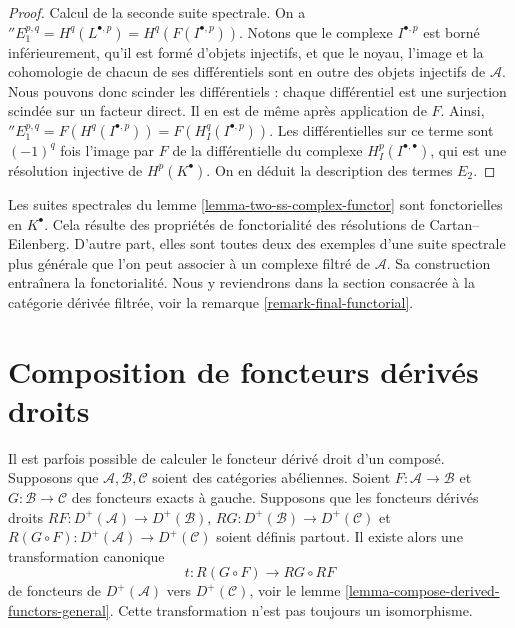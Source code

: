 \begin{proof}
\medskip\noindent
Calcul de la seconde suite spectrale. On a
${}''E_1^{p, q} = H^q(L^{\bullet, p}) = H^q(F(I^{\bullet, p}))$.
Notons que le complexe $I^{\bullet, p}$ est borné inférieurement, qu'il est
formé d'objets injectifs, et que le noyau, l'image et la cohomologie de chacun
de ses différentiels sont en outre des objets injectifs de $\mathcal{A}$. Nous
pouvons donc scinder les différentiels : chaque différentiel est une surjection
scindée sur un facteur direct. Il en est de même après application de $F$.
Ainsi,
${}''E_1^{p, q} = F(H^q(I^{\bullet, p})) = F(H^q_I(I^{\bullet, p}))$.
Les différentielles sur ce terme sont $(-1)^q$ fois l'image par $F$ de la
différentielle du complexe $H^p_I(I^{\bullet, \bullet})$, qui est une
résolution injective de $H^p(K^\bullet)$. On en déduit la description des
termes $E_2$.
\end{proof}

\begin{remark}
\label{remark-functorial-ss}
Les suites spectrales du lemme \ref{lemma-two-ss-complex-functor} sont
fonctorielles en $K^\bullet$. Cela résulte des propriétés de
fonctorialité des résolutions de Cartan--Eilenberg. D'autre part, elles sont
toutes deux des exemples d'une suite spectrale plus générale que l'on peut
associer à un complexe filtré de $\mathcal{A}$. Sa construction entraînera la
fonctorialité. Nous y reviendrons dans la section consacrée à la catégorie
dérivée filtrée, voir la remarque \ref{remark-final-functorial}.
\end{remark}


\section{Composition de foncteurs dérivés droits}
\label{section-composition-right-derived-functors}

\noindent
Il est parfois possible de calculer le foncteur dérivé droit d'un composé.
Supposons que $\mathcal{A}, \mathcal{B}, \mathcal{C}$ soient des catégories
abéliennes. Soient $F : \mathcal{A} \to \mathcal{B}$ et
$G : \mathcal{B} \to \mathcal{C}$ des foncteurs exacts à gauche. Supposons
que les foncteurs dérivés droits
$RF : D^{+}(\mathcal{A}) \to D^{+}(\mathcal{B})$,
$RG : D^{+}(\mathcal{B}) \to D^{+}(\mathcal{C})$ et
$R(G \circ F) : D^{+}(\mathcal{A}) \to D^{+}(\mathcal{C})$ soient définis
partout. Il existe alors une transformation canonique
$$
t : R(G \circ F) \longrightarrow RG \circ RF
$$
de foncteurs de $D^{+}(\mathcal{A})$ vers $D^{+}(\mathcal{C})$, voir le
lemme \ref{lemma-compose-derived-functors-general}.
Cette transformation n'est pas toujours un isomorphisme.

